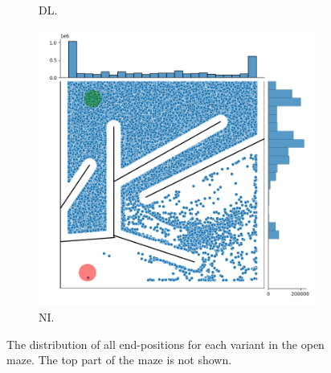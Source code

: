 \begin{figure}[H]
\begin{mdframed}
\begin{subfigure}[b]{0.5\textwidth}
            \caption{DL.}
        \end{subfigure}
        \begin{subfigure}[b]{0.5\textwidth}
            \includegraphics[scale=0.3]{resources/mazes/novelty_injection_open.png}
            \caption{NI.}
        \end{subfigure}
    \end{mdframed}
    \caption{The distribution of all end-positions for each variant in the open maze.
             The top part of the maze is not shown.}
    \label{distribution_open}
\end{figure}

